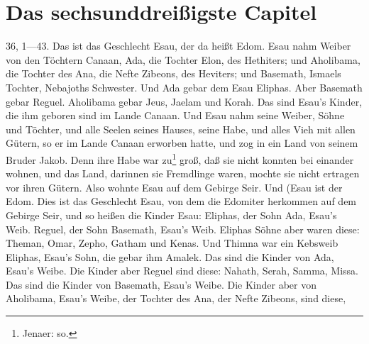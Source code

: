 \section{Das sechsunddreißigste Capitel}
36, 1—43. Das ist das Geschlecht Esau, der da heißt Edom. Esau nahm Weiber von den Töchtern Canaan, Ada, die Tochter Elon, des Hethiters; und Aholibama, die Tochter des Ana, die Nefte Zibeons, des Heviters; und Basemath, Ismaels Tochter, Nebajoths Schwester. Und Ada gebar dem Esau Eliphas. Aber Basemath gebar Reguel. Aholibama gebar Jeus, Jaelam und Korah. Das sind Esau’s Kinder, die ihm geboren sind im Lande Canaan. Und Esau nahm seine Weiber, Söhne und Töchter, und alle Seelen seines Hauses, seine Habe, und alles Vieh mit allen Gütern, so er im Lande Canaan erworben hatte, und zog in ein Land von seinem Bruder Jakob. Denn ihre Habe war zu\footnote{Jenaer: so.} groß, daß sie nicht konnten bei einander wohnen, und das Land, darinnen sie Fremdlinge waren, mochte sie nicht ertragen vor ihren Gütern. Also wohnte Esau auf dem Gebirge Seir. Und (Esau ist der Edom. Dies ist das Geschlecht Esau, von dem die Edomiter herkommen auf dem Gebirge Seir, und so heißen die Kinder Esau: Eliphas, der Sohn Ada, Esau’s Weib. Reguel, der Sohn Basemath, Esau’s Weib. Eliphas Söhne aber waren diese: Theman, Omar, Zepho, Gatham und Kenas. Und Thimna war ein Kebsweib Eliphas, Esau’s Sohn, die gebar ihm Amalek. Das sind die Kinder von Ada, Esau’s Weibe. Die Kinder aber Reguel sind diese: Nahath, Serah, Samma, Missa. Das sind die Kinder von Basemath, Esau’s Weibe. Die Kinder aber von Aholibama, Esau’s Weibe, der Tochter des Ana, der Nefte Zibeons, sind diese,
